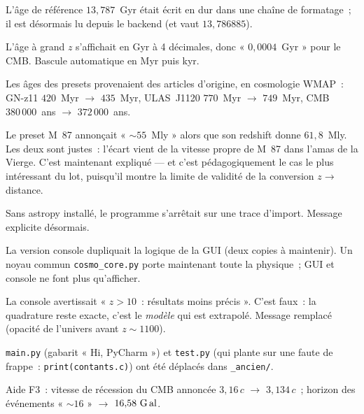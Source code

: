 \documentclass[11pt,a4paper]{report}
\newcommand{\Gly}{\text{G\,al}}
\newcommand{\avant}[1]{\textcolor{accentred}{#1}}
\newcommand{\apres}[1]{\textcolor{accentsage}{#1}}
\begin{document}
\begin{tcolorbox}[moyen,title={P4 à P7 --- données périmées ou codées en dur}]
\begin{description}[leftmargin=1.1cm,labelwidth=1cm,itemsep=2pt]
\item[P4] L'âge de référence $13{,}787$~Gyr était écrit en dur dans une chaîne
de formatage~; il est désormais lu depuis le backend (et vaut $13{,}786885$).
\item[P5] L'âge à grand $z$ s'affichait en Gyr à 4 décimales, donc
« $0{,}0004$~Gyr » pour le CMB. Bascule automatique en Myr puis kyr.
\item[P6] Les âges des presets provenaient des articles d'origine, en
cosmologie WMAP~: GN-z11 \avant{$420$~Myr} $\to$ \apres{$435$~Myr},
ULAS~J1120 \avant{$770$~Myr} $\to$ \apres{$749$~Myr}, CMB
\avant{$380\,000$~ans} $\to$ \apres{$372\,000$~ans}.
\item[P7] Le preset M~87 annonçait « $\sim55$~Mly » alors que son redshift donne
$61{,}8$~Mly. Les deux sont justes~: l'écart vient de la vitesse propre de
M~87 dans l'amas de la Vierge. C'est maintenant expliqué --- et c'est
pédagogiquement le cas le plus intéressant du lot, puisqu'il montre la limite
de validité de la conversion $z \to$ distance.
\end{description}
\end{tcolorbox}

\begin{tcolorbox}[moyen,title={P8 à P12 --- robustesse, structure, résidus}]
\begin{description}[leftmargin=1.1cm,labelwidth=1cm,itemsep=2pt]
\item[P8] Sans astropy installé, le programme s'arrêtait sur une trace
d'import. Message explicite désormais.
\item[P9] La version console dupliquait la logique de la GUI (deux copies à
maintenir). Un noyau commun \texttt{cosmo\_core.py} porte maintenant toute la
physique~; GUI et console ne font plus qu'afficher.
\item[P10] La console avertissait « $z>10$~: résultats moins précis ». C'est
faux~: la quadrature reste exacte, c'est le \emph{modèle} qui est extrapolé.
Message remplacé (opacité de l'univers avant $z\sim1100$).
\item[P11] \texttt{main.py} (gabarit « Hi, PyCharm ») et \texttt{test.py}
(qui plante sur une faute de frappe~: \texttt{print(contants.c)}) ont été
déplacés dans \texttt{\_ancien/}.
\item[P12] Aide F3~: vitesse de récession du CMB annoncée $3{,}16\,c$
$\to$ $3{,}134\,c$~; horizon des événements « $\sim16$ »
$\to$ $16{,}58~\Gly$.
\end{description}
\end{tcolorbox}
\end{document}
